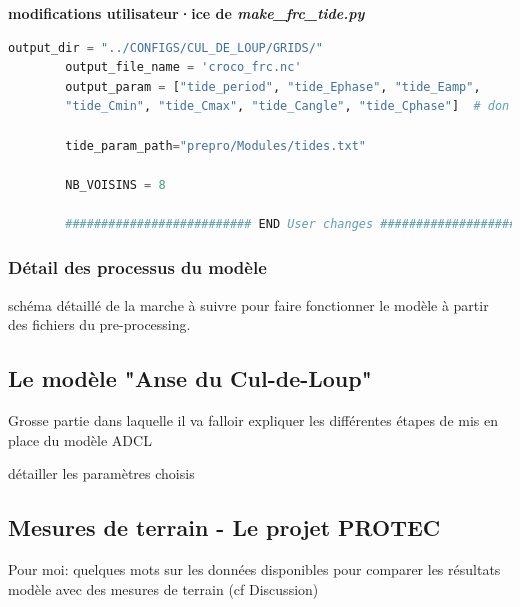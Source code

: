 \documentclass[10pt,a4paper,titlepage]{article}
\begin{document}
\begin{codeEnv}{\textbf{modifications utilisateur·ice de \textit{make\_frc\_tide.py}}}
\begin{lstlisting}[language=python]
        output_dir = "../CONFIGS/CUL_DE_LOUP/GRIDS/"
        output_file_name = 'croco_frc.nc'
        output_param = ["tide_period", "tide_Ephase", "tide_Eamp",
        "tide_Cmin", "tide_Cmax", "tide_Cangle", "tide_Cphase"]  # don't change the order

        tide_param_path="prepro/Modules/tides.txt"

        NB_VOISINS = 8

        ########################## END User changes ##########################
    \end{lstlisting}
\end{codeEnv}

\subsubsection{Détail des processus du modèle}
schéma détaillé de la marche à suivre pour faire fonctionner le modèle à partir des fichiers du pre-processing.

\subsection{Le modèle "Anse du Cul-de-Loup"}

Grosse partie dans laquelle il va falloir expliquer les différentes étapes de mis en place du modèle ADCL

détailler les paramètres choisis

\subsection{Mesures de terrain - Le projet PROTEC}

Pour moi: quelques mots sur les données disponibles pour comparer les résultats modèle avec des mesures de terrain (cf Discussion)
\end{document}
